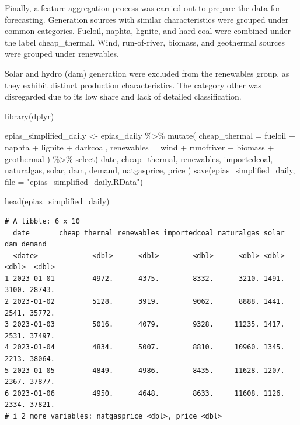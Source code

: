\documentclass[
]{article}
\newenvironment{Shaded}{\begin{snugshade}}{\end{snugshade}}
\newcommand{\AttributeTok}[1]{\textcolor[rgb]{0.40,0.45,0.13}{#1}}
\newcommand{\FunctionTok}[1]{\textcolor[rgb]{0.28,0.35,0.67}{#1}}
\newcommand{\NormalTok}[1]{\textcolor[rgb]{0.00,0.23,0.31}{#1}}
\newcommand{\OtherTok}[1]{\textcolor[rgb]{0.00,0.23,0.31}{#1}}
\newcommand{\SpecialCharTok}[1]{\textcolor[rgb]{0.37,0.37,0.37}{#1}}
\newcommand{\StringTok}[1]{\textcolor[rgb]{0.13,0.47,0.30}{#1}}
\begin{document}
Finally, a feature aggregation process was carried out to prepare the
data for forecasting. Generation sources with similar characteristics
were grouped under common categories. Fueloil, naphta, lignite, and hard
coal were combined under the label cheap\_thermal. Wind, run-of-river,
biomass, and geothermal sources were grouped under renewables.

Solar and hydro (dam) generation were excluded from the renewables
group, as they exhibit distinct production characteristics. The category
other was disregarded due to its low share and lack of detailed
classification.

\begin{Shaded}
\begin{Highlighting}[]
\FunctionTok{library}\NormalTok{(dplyr)}

\NormalTok{epias\_simplified\_daily }\OtherTok{\textless{}{-}}\NormalTok{ epias\_daily }\SpecialCharTok{\%\textgreater{}\%}
  \FunctionTok{mutate}\NormalTok{(}
    \AttributeTok{cheap\_thermal =}\NormalTok{ fueloil }\SpecialCharTok{+}\NormalTok{ naphta }\SpecialCharTok{+}\NormalTok{ lignite }\SpecialCharTok{+}\NormalTok{ darkcoal,}
    \AttributeTok{renewables =}\NormalTok{ wind }\SpecialCharTok{+}\NormalTok{ runofriver }\SpecialCharTok{+}\NormalTok{ biomass }\SpecialCharTok{+}\NormalTok{ geothermal}
\NormalTok{  ) }\SpecialCharTok{\%\textgreater{}\%}
  \FunctionTok{select}\NormalTok{(}
\NormalTok{    date, cheap\_thermal, renewables,}
\NormalTok{    importedcoal, naturalgas, solar, dam, demand, natgasprice, price}
\NormalTok{  )}
\FunctionTok{save}\NormalTok{(epias\_simplified\_daily, }\AttributeTok{file =} \StringTok{"epias\_simplified\_daily.RData"}\NormalTok{)}

\FunctionTok{head}\NormalTok{(epias\_simplified\_daily)}
\end{Highlighting}
\end{Shaded}

\begin{verbatim}
# A tibble: 6 x 10
  date       cheap_thermal renewables importedcoal naturalgas solar   dam demand
  <date>             <dbl>      <dbl>        <dbl>      <dbl> <dbl> <dbl>  <dbl>
1 2023-01-01         4972.      4375.        8332.      3210. 1491. 3100. 28743.
2 2023-01-02         5128.      3919.        9062.      8888. 1441. 2541. 35772.
3 2023-01-03         5016.      4079.        9328.     11235. 1417. 2531. 37497.
4 2023-01-04         4834.      5007.        8810.     10960. 1345. 2213. 38064.
5 2023-01-05         4849.      4986.        8435.     11628. 1207. 2367. 37877.
6 2023-01-06         4950.      4648.        8633.     11608. 1126. 2334. 37821.
# i 2 more variables: natgasprice <dbl>, price <dbl>
\end{verbatim}
\end{document}
